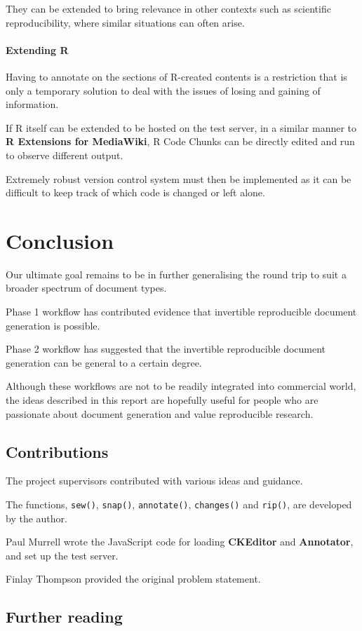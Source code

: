 \documentclass[a4paper, 12pt]{report}
\begin{document}
They can be extended to bring relevance in other contexts such as scientific reproducibility, where similar situations can often arise.


\subsubsection*{Extending R}
Having to annotate on the sections of R-created contents is a restriction that is only a temporary solution to deal with the issues of losing and gaining of information.

If R itself can be extended to be hosted on the test server, in a similar manner to \textbf{R Extensions for MediaWiki}, R Code Chunks can be directly edited and run to observe different output.

Extremely robust version control system must then be implemented as it can be difficult to keep track of which code is changed or left alone.


\chapter{Conclusion}
Our ultimate goal remains to be in further generalising the round trip to suit a broader spectrum of document types.

Phase 1 workflow has contributed evidence that invertible reproducible document generation is possible.

Phase 2 workflow has suggested that the invertible reproducible document generation can be general to a certain degree.

Although these workflows are not to be readily integrated into commercial world, the ideas described in this report are hopefully useful for people who are passionate about document generation and value reproducible research.


\section*{Contributions}
The project supervisors contributed with various ideas and guidance.

The functions, \texttt{sew()}, \texttt{snap()}, \texttt{annotate()}, \texttt{changes()} and \texttt{rip()}, are developed by the author.

Paul Murrell wrote the JavaScript code for loading \textbf{CKEditor} and \textbf{Annotator}, and set up the test server.

Finlay Thompson provided the original problem statement.


\section*{Further reading}




{}

\end{document}
